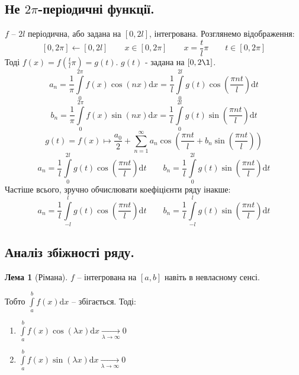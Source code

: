\documentclass[a4paper]{scrartcl}
\theoremstyle{definition}
\newtheorem*{lemme}{Лема}
\theoremstyle{remark}
\theoremstyle{definition}
\theoremstyle{definition}
\begin{document}
\subsection{Не $2\pi$-періодичні функції.}
$f$  -- $2l$ періодична, або задана на $[0, 2l]$, інтегрована. Розглянемо відображення:
$$
[0, 2\pi] \leftarrow [0, 2l] \qquad x \in [0, 2\pi] \qquad x = \frac{t}{l}\pi \qquad t\in [0, 2\pi]
$$
Тоді $f(x) = f( \frac{t}{l}\pi ) = g(t)$. $g(t)$ - задана на $[0, 2\l]$.
$$
a_n = \frac{1}{\pi}  \int\limits_{0}^{2\pi}{ f(x) \cos{(nx)} \mathrm{d} x } =   \frac{1
}{l }  \int\limits_{0}^{2l}{ g(t) \cos{ \left( \frac{\pi n t}{l}  \right)} \mathrm{d} t}
$$
$$
b_n = \frac{1}{\pi}  \int\limits_{0}^{2\pi}{ f(x) \sin{(nx)} \mathrm{d} x } =   \frac{1
}{l }  \int\limits_{0}^{2l}{ g(t) \sin{ \left( \frac{\pi n t}{l}  \right)} \mathrm{d} t}
$$
$$
g(t) = f(x) \mapsto \frac{a_0}{2} +  \sum\limits_{n = 1}^{ \infty}{a_n \cos{ \left(  \frac{\pi n t}{l} + b_n\sin{ \left( \frac{\pi n t}{l}  \right)}   \right)}}
$$
$$
a_n =\frac{1
}{l }  \int\limits_{0}^{2l}{ g(t) \cos{ \left( \frac{\pi n t}{l}  \right)} \mathrm{d} t}
 \qquad b_n = \frac{1
}{l }  \int\limits_{0}^{2l}{ g(t) \sin{ \left( \frac{\pi n t}{l}  \right)} \mathrm{d} t}
$$
Частіше всього, зручно обчислювати коефіцієнти ряду інакше:
$$
a_n =\frac{1
}{l }  \int\limits_{-l}^{l}{ g(t) \cos{ \left( \frac{\pi n t}{l}  \right)} \mathrm{d} t}
 \qquad b_n = \frac{1
}{l }  \int\limits_{-l}^{l}{ g(t) \sin{ \left( \frac{\pi n t}{l}  \right)} \mathrm{d} t}
$$

\subsection{Аналіз збіжності ряду.}
\begin{lemme}[Рімана]
$f$ -- інтегрована на $[a,b]$ навіть в невласному сенсі. \par Тобто $ \int\limits_{a}^{b}{f(x) \mathrm{d} x}$ -- збігається. Тоді:
\begin{enumerate}
  \item $\displaystyle  \int\limits_{a}^{ b}{f(x) \cos{(\lambda x)} \mathrm{d} x } \xrightarrow[\lambda\to\infty]{} 0 $
    \item $\displaystyle  \int\limits_{a}^{ b}{f(x) \sin{(\lambda x)} \mathrm{d} x } \xrightarrow[\lambda\to\infty]{} 0 $
\end{enumerate}

\end{lemme}
\end{document}
